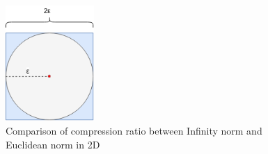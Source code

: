 \begin{figure}
    \centering
    \includegraphics[width=0.3\textwidth]{figures/2D_Comparison.png}
    \caption{Comparison of compression ratio between Infinity norm and Euclidean norm in 2D}
    \label{fig:norm-comparison-2D}
\end{figure}
